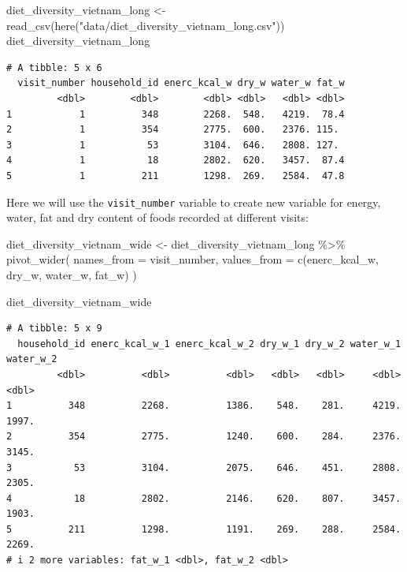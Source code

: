\documentclass[
  letterpaper,
  DIV=11,
  numbers=noendperiod]{scrreprt}
\newenvironment{Shaded}{\begin{snugshade}}{\end{snugshade}}
\newcommand{\AttributeTok}[1]{\textcolor[rgb]{0.40,0.45,0.13}{#1}}
\newcommand{\FunctionTok}[1]{\textcolor[rgb]{0.28,0.35,0.67}{#1}}
\newcommand{\NormalTok}[1]{\textcolor[rgb]{0.00,0.23,0.31}{#1}}
\newcommand{\OtherTok}[1]{\textcolor[rgb]{0.00,0.23,0.31}{#1}}
\newcommand{\SpecialCharTok}[1]{\textcolor[rgb]{0.37,0.37,0.37}{#1}}
\newcommand{\StringTok}[1]{\textcolor[rgb]{0.13,0.47,0.30}{#1}}
\begin{document}
\begin{Shaded}
\begin{Highlighting}[]
\NormalTok{diet\_diversity\_vietnam\_long }\OtherTok{\textless{}{-}} \FunctionTok{read\_csv}\NormalTok{(}\FunctionTok{here}\NormalTok{(}\StringTok{"data/diet\_diversity\_vietnam\_long.csv"}\NormalTok{))}
\NormalTok{diet\_diversity\_vietnam\_long}
\end{Highlighting}
\end{Shaded}

\begin{verbatim}
# A tibble: 5 x 6
  visit_number household_id enerc_kcal_w dry_w water_w fat_w
         <dbl>        <dbl>        <dbl> <dbl>   <dbl> <dbl>
1            1          348        2268.  548.   4219.  78.4
2            1          354        2775.  600.   2376. 115. 
3            1           53        3104.  646.   2808. 127. 
4            1           18        2802.  620.   3457.  87.4
5            1          211        1298.  269.   2584.  47.8
\end{verbatim}

Here we will use the \texttt{visit\_number} variable to create new
variable for energy, water, fat and dry content of foods recorded at
different visits:

\begin{Shaded}
\begin{Highlighting}[]
\NormalTok{diet\_diversity\_vietnam\_wide }\OtherTok{\textless{}{-}}
\NormalTok{  diet\_diversity\_vietnam\_long }\SpecialCharTok{\%\textgreater{}\%}
  \FunctionTok{pivot\_wider}\NormalTok{(}
    \AttributeTok{names\_from =}\NormalTok{ visit\_number, }
    \AttributeTok{values\_from =} \FunctionTok{c}\NormalTok{(enerc\_kcal\_w, dry\_w, water\_w, fat\_w)}
\NormalTok{  )}

\NormalTok{diet\_diversity\_vietnam\_wide}
\end{Highlighting}
\end{Shaded}

\begin{verbatim}
# A tibble: 5 x 9
  household_id enerc_kcal_w_1 enerc_kcal_w_2 dry_w_1 dry_w_2 water_w_1 water_w_2
         <dbl>          <dbl>          <dbl>   <dbl>   <dbl>     <dbl>     <dbl>
1          348          2268.          1386.    548.    281.     4219.     1997.
2          354          2775.          1240.    600.    284.     2376.     3145.
3           53          3104.          2075.    646.    451.     2808.     2305.
4           18          2802.          2146.    620.    807.     3457.     1903.
5          211          1298.          1191.    269.    288.     2584.     2269.
# i 2 more variables: fat_w_1 <dbl>, fat_w_2 <dbl>
\end{verbatim}
\end{document}
